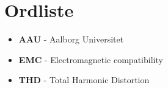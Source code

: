 \section*{Ordliste}
\begin{itemize}
\item \textbf{AAU} - Aalborg Universitet
\item \textbf{EMC} - Electromagnetic compatibility
\item \textbf{THD} - Total Harmonic Distortion
\end{itemize}

\newpage